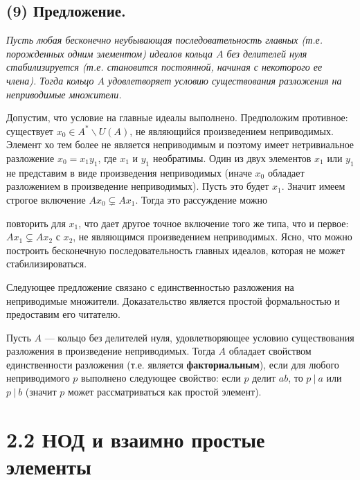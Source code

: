 \documentclass{../../template/mai_book}
\begin{document}
\subsection{(9) Предложение.}
\textit{\indent Пусть любая бесконечно неубывающая последовательность главных (т.е. порожденных одним элементом) идеалов кольца $A$ без делителей нуля стабилизируется (т.е. становится постоянной, начиная с некоторого ее члена). Тогда кольцо $A$ удовлетворяет условию существования разложения на неприводимые множители.}

\begin{myproof}
Допустим, что условие на главные идеалы выполнено. Предположим противное: существует $x_0 \in A^* \backslash U(A)$, не являющийся произведением неприводимых. Элемент хо тем более не является неприводимым и поэтому имеет нетривиальное разложение $x_0 = x_1 y_1$, где $x_1$ и $y_1$ необратимы. Один из двух элементов $x_1$ или $y_1$ не представим в виде произведения неприводимых (иначе $x_0$ обладает разложением в произведение неприводимых). Пусть это будет $x_1$. Значит имеем строгое включение $A x_0 \varsubsetneq A x_1$. Тогда это рассуждение можно

\newpage
\noindent повторить для $x_1$, что дает другое точное включение того же типа, что и первое: $A x_1 \varsubsetneq A x_2$ с $x_2$, не являющимся произведением неприводимых. Ясно, что можно построить бесконечную последовательность главных идеалов, которая не может стабилизироваться.
\end{myproof}

Следующее предложение связано с единственностью разложения на неприводимые множители. Доказательство является простой формальностью и предоставим его читателю.

\begin{predl}
\textit{\indent} Пусть $A$ — кольцо без делителей нуля, удовлетворяющее условию существования разложения в произведение неприводимых. Тогда $A$ обладает свойством единственности разложения (т.е. является \textbf{факториальным}), если для любого неприводимого $p$ выполнено следующее свойство: если $p$ делит $ab$, то $p\:|\:a$ или $p\:|\:b$ (значит $p$ может рассматриваться как простой элемент).
\end{predl}

\section{\large 2.2 НОД и взаимно простые элементы}
\end{document}

